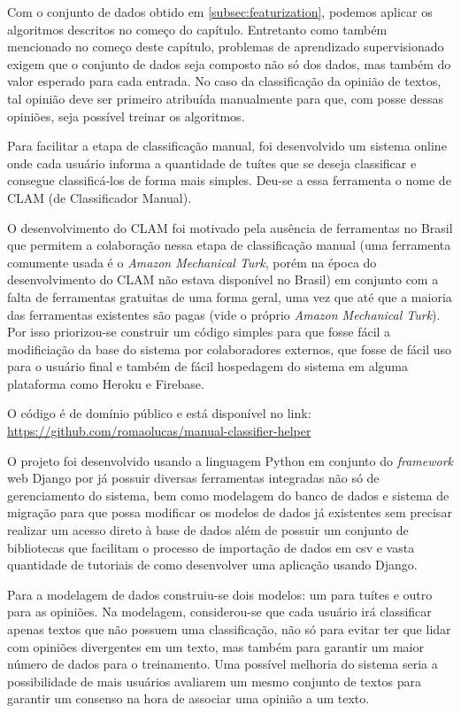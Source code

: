 Com o conjunto de dados obtido em \ref{subsec:featurization}, podemos aplicar os algoritmos 
descritos no começo do capítulo. Entretanto como também mencionado no começo deste capítulo,
problemas de aprendizado supervisionado exigem que o conjunto de dados seja composto não só dos
dados, mas também do valor esperado para cada entrada. No caso da classificação da opinião de
textos, tal opinião deve ser primeiro atribuída manualmente para que, com posse dessas opiniões,
seja possível treinar os algoritmos.

Para facilitar a etapa de classificação manual, foi desenvolvido um sistema online onde cada usuário
informa a quantidade de tuítes que se deseja classificar e consegue classificá-los de forma
mais simples. Deu-se a essa ferramenta o nome de CLAM (de Classificador Manual).

O desenvolvimento do CLAM foi motivado pela ausência de ferramentas no Brasil que permitem a
colaboração nessa etapa de classificação manual (uma ferramenta comumente usada é o \textit{Amazon
Mechanical Turk}, porém na época do desenvolvimento do CLAM não estava disponível no Brasil)
em conjunto com a falta de ferramentas gratuitas de 
uma forma geral, uma vez que até que a maioria das ferramentas existentes são pagas (vide o 
próprio \textit{Amazon Mechanical Turk}). Por isso priorizou-se construir um código simples
para que fosse fácil a modificiação da base do sistema por colaboradores externos,
que fosse de fácil uso para o usuário final e também de fácil hospedagem do sistema
em alguma plataforma como Heroku e Firebase.

O código é de domínio público e está disponível no link:
 \url{https://github.com/romaolucas/manual-classifier-helper}

O projeto foi desenvolvido usando a linguagem Python em conjunto do \textit{framework} web
Django por já possuir diversas ferramentas integradas não só de gerenciamento do sistema, bem como
modelagem do banco de dados e sistema de migração para que possa modificar os modelos de dados já
existentes sem precisar realizar um acesso direto à base de dados além de possuir um conjunto
de bibliotecas que facilitam o processo de importação de dados em csv e vasta quantidade de 
tutoriais de como desenvolver uma aplicação usando Django.

Para a modelagem de dados construiu-se dois modelos: um para tuítes e outro para
as opiniões.
Na modelagem, considerou-se que cada usuário irá classificar apenas textos que não 
possuem uma classificação, não só para evitar ter que lidar com opiniões divergentes em um texto,
mas também para garantir um maior número de dados para o treinamento. Uma possível melhoria
do sistema seria a possibilidade de mais usuários avaliarem um mesmo conjunto de textos para
garantir um consenso na hora de associar uma opinião a um texto.

